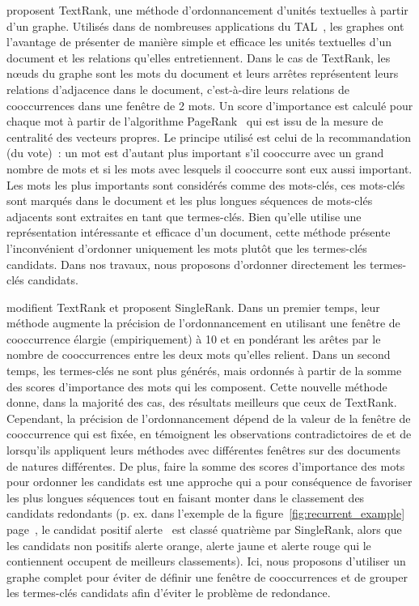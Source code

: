      proposent TextRank, une méthode
    d'ordonnancement d'unités textuelles à partir d'un graphe. Utilisés dans de
    nombreuses applications du TAL~\cite{kozareva2013textgraphs}, les graphes
    ont l'avantage de présenter de manière simple et efficace les unités
    textuelles d'un document et les relations qu'elles entretiennent. Dans le
    cas de TextRank, les n\oe{}uds du graphe sont les mots du document et leurs
    arrêtes représentent leurs relations d'adjacence dans le document,
    c'est-à-dire leurs relations de cooccurrences dans une fenêtre de 2 mots. Un
    score d'importance est calculé pour chaque mot à partir de l'algorithme
    PageRank~\cite{brin1998pagerank} qui est issu de la mesure de centralité des
    vecteurs propres. Le principe utilisé est celui de la recommandation (du
    vote)~: un mot est d'autant plus important s'il cooccurre avec un grand
    nombre de mots et si les mots avec lesquels il cooccurre sont eux aussi
    important. Les mots les plus importants sont considérés comme des mots-clés,
    ces mots-clés sont marqués dans le document et les plus longues séquences de
    mots-clés adjacents sont extraites en tant que termes-clés. Bien qu'elle
    utilise une représentation intéressante et efficace d'un document, cette
    méthode présente l'inconvénient d'ordonner uniquement les mots plutôt que
    les termes-clés candidats. Dans nos travaux, nous proposons d'ordonner
    directement les termes-clés candidats.

     modifient TextRank et proposent SingleRank. Dans
    un premier temps, leur méthode augmente la précision de l'ordonnancement en
    utilisant une fenêtre de cooccurrence élargie (empiriquement) à 10 et en
    pondérant les arêtes par le nombre de cooccurrences entre les deux mots
    qu'elles relient. Dans un second temps, les termes-clés ne sont plus
    générés, mais ordonnés à partir de la somme des scores d'importance des mots
    qui les composent. Cette nouvelle méthode donne, dans la majorité des cas,
    des résultats meilleurs que ceux de TextRank. Cependant, la précision de
    l'ordonnancement dépend de la valeur de la fenêtre de cooccurrence qui est
    fixée, en témoignent les observations contradictoires de
     et de  lorsqu'ils
    appliquent leurs méthodes avec différentes fenêtres sur des documents de
    natures différentes. De plus, faire la somme des scores d'importance des
    mots pour ordonner les candidats est une approche qui a pour conséquence de
    favoriser les plus longues séquences tout en faisant monter dans le
    classement des candidats redondants (p. ex. dans l'exemple de la
    figure~\ref{fig:recurrent_example} page~\pageref{fig:recurrent_example}, le
    candidat positif \og{}alerte~\fg{} est classé quatrième par SingleRank,
    alors que les candidats non positifs \og{}alerte orange\fg{}, \og{}alerte
    jaune\fg{} et \og{}alerte rouge\fg{} qui le contiennent occupent de
    meilleurs classements). Ici, nous proposons d'utiliser un graphe complet
    pour éviter de définir une fenêtre de cooccurrences et de grouper les
    termes-clés candidats afin d'éviter le problème de redondance.

